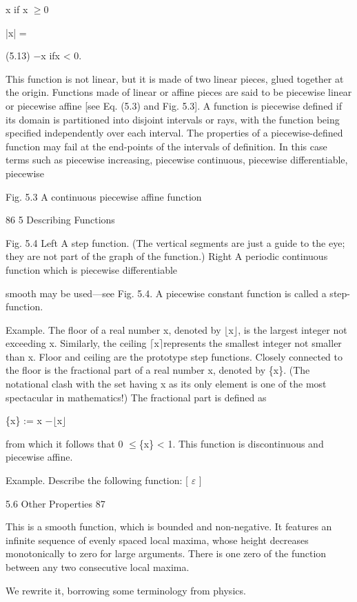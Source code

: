 \documentclass[11pt]{article}
\theoremstyle{plain}
\theoremstyle{definition}
\begin{document}
x if x $\geq$0

|x| =

(5.13) $-$x ifx < 0.

This function is not linear, but it is made of two linear pieces, glued together at the origin. Functions made of linear or affine pieces are said to be piecewise linear or piecewise affine [see Eq. (5.3) and Fig. 5.3]. A function is piecewise defined if its domain is partitioned into disjoint intervals or rays, with the function being specified independently over each interval. The properties of a piecewise-defined function may fail at the end-points of the intervals of definition. In this case terms such as piecewise increasing, piecewise continuous, piecewise differentiable, piecewise

Fig. 5.3 A continuous piecewise affine function

86 5 Describing Functions

Fig. 5.4 Left A step function. (The vertical segments are just a guide to the eye; they are not part of the graph of the function.) Right A periodic continuous function which is piecewise differentiable

smooth may be used---see Fig. 5.4. A piecewise constant function is called a step-function.

Example. The floor of a real number x, denoted by $\lfloor$x$\rfloor$, is the largest integer not exceeding x. Similarly, the ceiling $\lceil$x$\rceil$represents the smallest integer not smaller than x. Floor and ceiling are the prototype step functions. Closely connected to the floor is the fractional part of a real number x, denoted by \{x\}. (The notational clash with the set having x as its only element is one of the most spectacular in mathematics!) The fractional part is defined as

\{x\} := x $-$$\lfloor$x$\rfloor$

from which it follows that 0 $\leq$\{x\} < 1. This function is discontinuous and piecewise affine.

Example. Describe the following function: [ $\varepsilon$ ]

5.6 Other Properties 87

This is a smooth function, which is bounded and non-negative. It features an infinite sequence of evenly spaced local maxima, whose height decreases monotonically to zero for large arguments. There is one zero of the function between any two consecutive local maxima.

We rewrite it, borrowing some terminology from physics.
\end{document}
